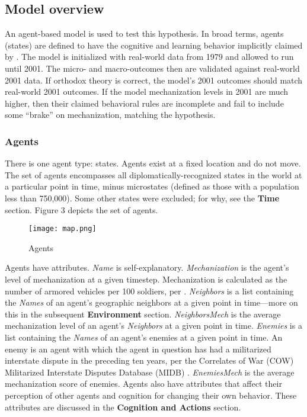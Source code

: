 \documentclass{article}
\begin{document}
\subsection{Model overview}

An agent-based model is used to test this hypothesis. In broad
terms, agents (states) are defined to have the cognitive and learning behavior
implicitly claimed by \citet{sechser2010army}. The model is initialized with
real-world data from 1979 and allowed to run until 2001. The micro- and
macro-outcomes then are validated against real-world 2001 data. If
orthodox theory is correct, the model's 2001 outcomes should match
real-world 2001 outcomes. If the model mechanization levels in 2001 are much
higher, then their claimed behavioral rules are incomplete and fail to include
some ``brake'' on mechanization, matching the hypothesis. 

\subsubsection{Agents}

There is one agent type: states. Agents exist at a fixed location and do not
move. The set of agents encompasses all diplomatically-recognized 
states in the world at a particular point in time, minus microstates (defined as
those with a population less than 750,000). Some other states were excluded; for
why, see the \textbf{Time} section. Figure 3 depicts the set of agents.

\begin{figure}[h!]
	\centering
	\caption{Agents}
	\texttt{[image: map.png]}
\end{figure}

Agents have attributes. \textit{Name} is self-explanatory.
\textit{Mechanization} is the agent's level of mechanization at a given
timestep. Mechanization is calculated as the number of armored vehicles per 100
soldiers, per \citet{sechser2010army}. \textit{Neighbors} is a list containing
the \textit{Names} of an agent's geographic neighbors at a given point in
time---more on this in the subsequent \textbf{Environment} section. \textit{NeighborsMech} is the
average mechanization level of an agent's \textit{Neighbors} at a given point in
time. \textit{Enemies} is a list containing the \textit{Names} of an agent's
enemies at a given point in time. An enemy is an agent with which the agent in
question has had a militarized interstate dispute in the preceding ten years,
per the Correlates of War (COW) Militarized Interstate Disputes Database (MIDB)
\citep{cow_midb}. \textit{EnemiesMech} is the average mechanization score of
enemies. Agents also have attributes that affect their
perception of other agents and cognition for changing their own behavior. These
attributes are discussed in the \textbf{Cognition and Actions} section.
\end{document}
